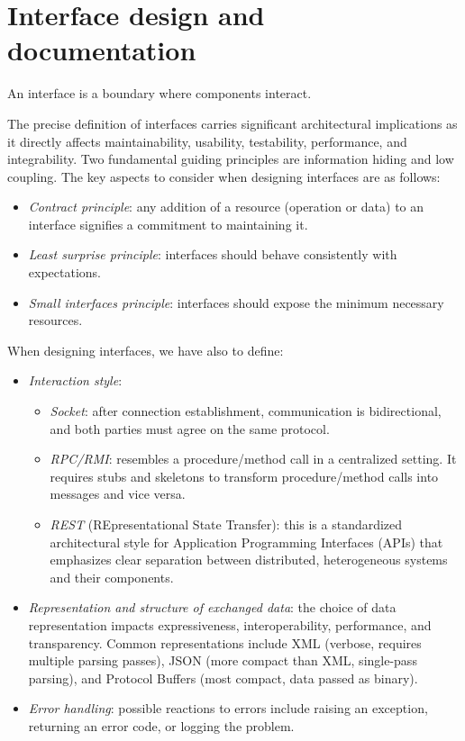 \section{Interface design and documentation}

\begin{definition}
    An interface is a boundary where components interact. 
\end{definition}
The precise definition of interfaces carries significant architectural implications as it directly affects maintainability, usability, testability, performance, and integrability. 
Two fundamental guiding principles are information hiding and low coupling.
The key aspects to consider when designing interfaces are as follows: 
\begin{itemize}
    \item \textit{Contract principle}: any addition of a resource (operation or data) to an interface signifies a commitment to maintaining it.
    \item \textit{Least surprise principle}: interfaces should behave consistently with expectations. 
    \item \textit{Small interfaces principle}: interfaces should expose the minimum necessary resources.
\end{itemize}
When designing interfaces, we have also to define: 
\begin{itemize}
    \item \textit{Interaction style}: 
        \begin{itemize}
            \item \textit{Socket}: after connection establishment, communication is bidirectional, and both parties must agree on the same protocol.
            \item \textit{RPC/RMI}: resembles a procedure/method call in a centralized setting. 
                It requires stubs and skeletons to transform procedure/method calls into messages and vice versa.
            \item \textit{REST} (REpresentational State Transfer): this is a standardized architectural style for Application Programming Interfaces (APIs) that emphasizes clear separation between distributed, heterogeneous systems and their components.
        \end{itemize}
    \item \textit{Representation and structure of exchanged data}: the choice of data representation impacts expressiveness, interoperability, performance, and transparency.
        Common representations include XML (verbose, requires multiple parsing passes), JSON (more compact than XML, single-pass parsing), and Protocol Buffers (most compact, data passed as binary).
    \item \textit{Error handling}: possible reactions to errors include raising an exception, returning an error code, or logging the problem.
\end{itemize}
